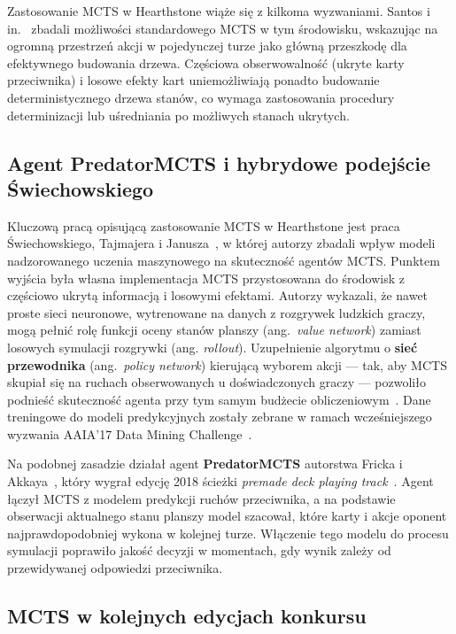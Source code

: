 Zastosowanie MCTS w Hearthstone wiąże się z kilkoma wyzwaniami. Santos i in.~\cite{Santos2017} zbadali możliwości standardowego MCTS w tym środowisku, wskazując na ogromną przestrzeń akcji w pojedynczej turze jako główną przeszkodę dla efektywnego budowania drzewa. Częściowa obserwowalność (ukryte karty przeciwnika) i losowe efekty kart uniemożliwiają ponadto budowanie deterministycznego drzewa stanów, co wymaga zastosowania procedury determinizacji lub uśredniania po możliwych stanach ukrytych.


\subsection{Agent PredatorMCTS i hybrydowe podejście Świechowskiego}

Kluczową pracą opisującą zastosowanie MCTS w Hearthstone jest praca Świechowskiego, Tajmajera i Janusza~\cite{swiechowski2018}, w której autorzy zbadali wpływ modeli nadzorowanego uczenia maszynowego na skuteczność agentów MCTS. Punktem wyjścia była własna implementacja MCTS przystosowana do środowisk z częściowo ukrytą informacją i losowymi efektami. Autorzy wykazali, że nawet proste sieci neuronowe, wytrenowane na danych z rozgrywek ludzkich graczy, mogą pełnić rolę funkcji oceny stanów planszy (ang.~\textit{value network}) zamiast losowych symulacji rozgrywki (ang. \textit{rollout}). Uzupełnienie algorytmu o \textbf{sieć przewodnika} (ang.~\textit{policy network}) kierującą wyborem akcji --- tak, aby MCTS skupiał się na ruchach obserwowanych u doświadczonych graczy --- pozwoliło podnieść skuteczność agenta przy tym samym budżecie obliczeniowym~\cite{swiechowski2018}. Dane treningowe do modeli predykcyjnych zostały zebrane w ramach wcześniejszego wyzwania AAIA'17 Data Mining Challenge~\cite{Janusz2017}.

Na podobnej zasadzie działał agent \textbf{PredatorMCTS} autorstwa Fricka i Akkaya~\cite{dockhorn2018}, który wygrał edycję 2018 ścieżki \textit{premade deck playing track}~\cite{hearthstone_competition}. Agent łączył MCTS z modelem predykcji ruchów przeciwnika, a na podstawie obserwacji aktualnego stanu planszy model szacował, które karty i akcje oponent najprawdopodobniej wykona w kolejnej turze. Włączenie tego modelu do procesu symulacji poprawiło jakość decyzji w momentach, gdy wynik zależy od przewidywanej odpowiedzi przeciwnika.

\subsection{MCTS w kolejnych edycjach konkursu}


